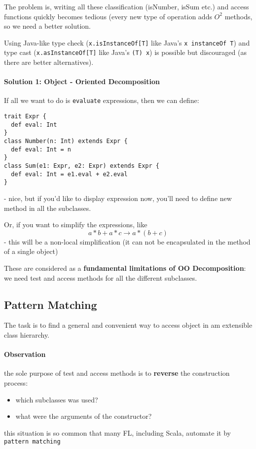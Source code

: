 \documentclass{scrartcl}
\newcommand{\term}[1]{\verb~#1~} %
\begin{document}
The problem is, writing all these classification (isNumber, isSum etc.) and
access functions quickly becomes tedious (every new type of operation adds $O^2$
methods, so we need a better solution.

Using Java-like type check (\lstinline|x.isInstanceOf[T]| like Java's
\lstinline|x instanceOf T|) and type cast (\lstinline|x.asInstanceOf[T]| like
Java's \lstinline|(T) x|) is possible but discouraged (as there are better
alternatives).

\paragraph{Solution 1: Object - Oriented Decomposition}

If all we want to do is \term{evaluate} expressions, then we can define:
\begin{lstlisting}
trait Expr {
  def eval: Int
}
class Number(n: Int) extends Expr {
  def eval: Int = n
}
class Sum(e1: Expr, e2: Expr) extends Expr {
  def eval: Int = e1.eval + e2.eval
}
\end{lstlisting}
- nice, but if you'd like to display expression now, you'll need to define new
method in all the subclasses.

Or, if you want to simplify the expressions, like
$$ a * b + a * c \to a * (b + c)$$
- this will be a non-local simplification (it can not be encapsulated in the
method of a single object)

These are considered as a {\bf fundamental limitations of OO Decomposition}: we
need test and access methods for all the different subclasses.

\subsection{Pattern Matching }
\label{sec:PatternMatching}

The task is to find a general and convenient way to access object in am
extensible class hierarchy.

\paragraph{Observation}the sole purpose of test and access methods is to {\bf
  reverse} the construction process:
\begin{itemize}
\item which subclasses was used?
\item what were the arguments of the constructor?
\end{itemize}
this situation is so common that many FL, including Scala, automate it by
\term{pattern matching}
\end{document}
